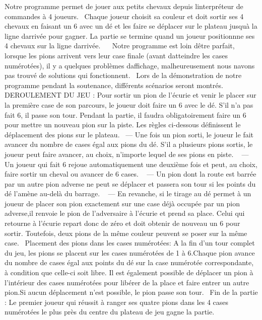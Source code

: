Notre programme permet de jouer aux petits chevaux depuis l\textquotesingle{}interpréteur de commandes à 4 joueurs.~\newline
 Chaque joueur choisit sa couleur et doit sortir ses 4 chevaux en faisant un 6 avec un dé et les faire se déplacer sur le plateau jusqu\textquotesingle{}à la ligne d\textquotesingle{}arrivée pour gagner. La partie se termine quand un joueur positionnne ses 4 chevaux sur la ligne d\textquotesingle{}arrivée.~\newline
~\newline
 Notre programme est loin d\textquotesingle{}être parfait, lorsque les pions arrivent vers leur case finale (avant d\textquotesingle{}atteindre les cases numérotées), il y a quelques problèmes d\textquotesingle{}affichage, malheureusement nous n\textquotesingle{}avons pas trouvé de solutions qui fonctionnent.~\newline
 Lors de la démonstration de notre programme pendant la soutenance, différents scénarios seront montrés.~\newline
~\newline
 D\+E\+R\+O\+U\+L\+E\+M\+E\+NT DU J\+EU \+: Pour sortir un pion de l’écurie et venir le placer sur la première case de son parcours, le joueur doit faire un 6 avec le dé. S’il n’a pas fait 6, il passe son tour. Pendant la partie, il faudra obligatoirement faire un 6 pour mettre un nouveau pion sur la piste. Les règles ci-\/dessous déﬁnissent le déplacement des pions sur le plateau.~\newline
 — Une fois un pion sorti, le joueur le fait avancer du nombre de cases égal aux pions du dé. S’il a plusieurs pions sortis, le joueur peut faire avancer, au choix, n’importe lequel de ses pions en piste. ~\newline
— Un joueur qui fait 6 rejoue automatiquement une deuxième fois et peut, au choix, faire sortir un cheval ou avancer de 6 cases. ~\newline
— Un pion dont la route est barrée par un autre pion adverse ne peut se déplacer et passera son tour si les points du dé l’amène au-\/delà du barrage. ~\newline
— En revanche, si le tirage au dé permet à un joueur de placer son pion exactement sur une case déjà occupée par un pion adverse,il renvoie le pion de l’adversaire à l’écurie et prend sa place. Celui qui retourne à l’écurie repart donc de zéro et doit obtenir de nouveau un 6 pour sortir. Toutefois, deux pions de la même couleur peuvent se poser sur la même case.~\newline
Placement des pions dans les cases numérotées\+: A la ﬁn d’un tour complet du jeu, les pions se placent sur les cases numérotées de 1 à 6.\+Chaque pion avance du nombre de cases égal aux points du dé sur la case numérotée correspondante, à condition que celle-\/ci soit libre. Il est également possible de déplacer un pion à l’intérieur des cases numérotées pour libérer de la place et faire entrer un autre pion.\+Si aucun déplacement n’est possible, le pion passe son tour.~\newline
Fin de la partie \+: Le premier joueur qui réussit à ranger ses quatre pions dans les 4 cases numérotées le plus près du centre du plateau de jeu gagne la partie. 